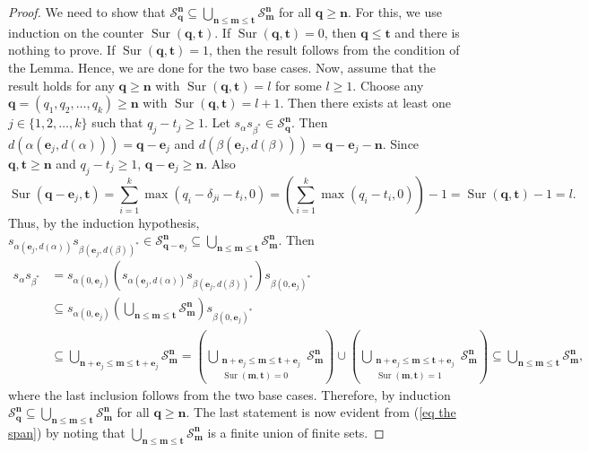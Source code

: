 \documentclass[a4paper,reqno,12pt]{amsart}
\numberwithin{equation}{section}
\theoremstyle{definition}
\theoremstyle{remark}
\newcommand{\sur}{\operatorname{Sur}}
\newcommand{\N}{\mathbf{n}}
\newcommand{\M}{\mathbf{m}}
\newcommand{\Q}{\mathbf{q}}
\newcommand{\bT}{\mathbf{t}}
\newcommand{\mS}{\mathcal{S}}
\begin{document}
\begin{proof}
We need to show that $\mS_\Q^\N\subseteq \displaystyle{\bigcup_{\N\le \M\le \bT}} \mS_\M^\N$ for all $\Q\ge \N$. For this, we use induction on the counter $\sur(\Q,\bT)$. If $\sur(\Q,\bT)=0$, then $\Q\le \bT$ and there is nothing to prove. If $\sur(\Q,\bT)=1$, then the result follows from the condition of the Lemma. Hence, we are done for the two base cases. Now, assume that the result holds for any $\Q\ge \N$ with $\sur(\Q,\bT)=l$ for some $l\ge 1$. Choose any $\Q=(q_1,q_2,\ldots,q_k)\ge \N$ with $\sur(\Q,\bT)=l+1$. Then there exists at least one $j\in \{1,2,\ldots,k\}$ such that $q_j-t_j\ge 1$. Let $s_\alpha s_{\beta^*}\in \mS_\Q^\N$. Then $d(\alpha(\mathbf{e}_j,d(\alpha)))=\Q-\mathbf{e}_j$ and $d(\beta(\mathbf{e}_j,d(\beta)))=\Q-\mathbf{e}_j-\N$. Since $\Q,\bT\ge \N$ and $q_j-t_j\ge 1$, $\Q-\mathbf{e}_j\ge \N$. Also \[\sur(\Q-\mathbf{e}_j,\bT)=\displaystyle{\sum_{i=1}^{k}} \max(q_i-\delta_{ji}-t_i,0)=\left(\displaystyle{\sum_{i=1}^{k}}\max(q_i-t_i,0)\right)-1=\sur(\Q,\bT)-1=l.\] Thus, by the induction hypothesis, $s_{\alpha(\mathbf{e}_j,d(\alpha))}s_{\beta(\mathbf{e}_j,d(\beta))^*}\in \mS_{\Q-\mathbf{e}_j}^\N\subseteq \displaystyle{\bigcup_{\N\le \M\le \bT}} \mS_\M^\N$. Then 
\begin{align*}
s_\alpha s_{\beta^*}&=s_{\alpha(0,\mathbf{e}_j)}(s_{\alpha(\mathbf{e}_j,d(\alpha))}s_{\beta(\mathbf{e}_j,d(\beta))^*})s_{\beta(0,\mathbf{e}_j)^*}\\
&\subseteq s_{\alpha(0,\mathbf{e}_j)}\left(\displaystyle{\bigcup_{\N\le \M\le \bT}} \mS_\M^\N\right)s_{\beta(0,\mathbf{e}_j)^*}\\
&\subseteq \displaystyle{\bigcup_{\N+\mathbf{e}_j\le \M\le \bT+\mathbf{e}_j}} \mS_\M^\N=\left(\displaystyle{\bigcup_{\substack{\N+\mathbf{e}_j\le \M\le \bT+\mathbf{e}_j\\\sur(\M,\bT)=0}}} \mS_\M^\N\right)\cup \left(\displaystyle{\bigcup_{\substack{\N+\mathbf{e}_j\le \M\le \bT+\mathbf{e}_j\\\sur(\M,\bT)=1}}} \mS_\M^\N\right) \subseteq \displaystyle{\bigcup_{\N\le \M\le \bT}} \mS_\M^\N,
\end{align*} 
where the last inclusion follows from the two base cases. Therefore, by induction $\mS_\Q^\N\subseteq \displaystyle{\bigcup_{\N\le \M\le \bT}} \mS_\M^\N$ for all $\Q\ge \N$. The last statement is now evident from (\ref{eq the span}) by noting that $\displaystyle{\bigcup_{\N\le \M\le \bT}} \mS_\M^\N$ is a finite union of finite sets.  
\end{proof}
\end{document}
